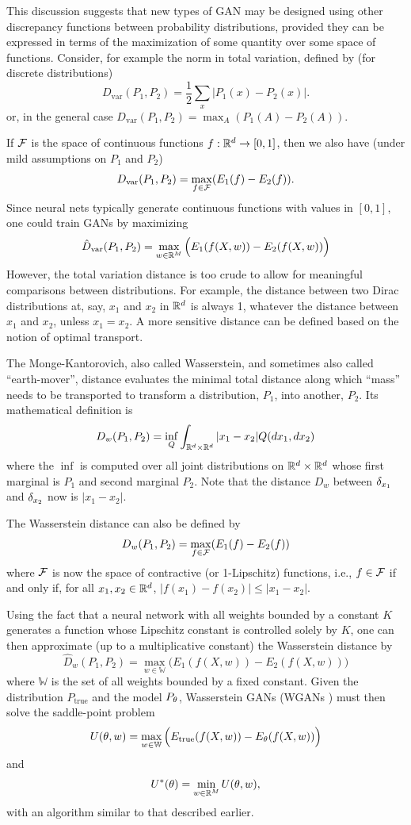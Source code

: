  This discussion suggests that new types of GAN may be designed using other discrepancy functions between probability distributions, provided they can be expressed in terms of the maximization of some quantity over some space of functions.
  Consider, for example the norm in total variation, defined by (for discrete distributions)
\[
D_{\mathrm{var}}(P_1,P_2) = \frac 12 \sum_{x} |P_1(x) - P_2(x)|.
\]
or, in the general case $D_{\mathrm{var}}(P_1,P_2)  = \max_A(P_1(A) - P_2(A))$.

 If ${\mathcal F}$ is the space of continuous functions $f: {\mathbb{R}}^d \to [0,1]$, then we also have (under mild assumptions on $P_1$ and $P_2$)
\[
D_{\mathrm{var}}(P_1,P_2)  = \max_{f\in{\mathcal F}} (E_1(f) - E_2(f)).
\]
 Since neural nets typically generate continuous functions with values in $[0,1]$, one could train GANs by maximizing 
\[
\hat D_{\mathrm{var}}(P_1, P_2) = 
\max_{w\in {\mathbb{R}}^M} \Big(E_{1}(f(X, w)) - E_{2}(f(X, w))\Big)
\]
 However, the total variation distance is too crude to allow for meaningful comparisons between distributions. For example, the distance between two Dirac distributions at, say,  $x_1$ and $x_2$ in ${\mathbb{R}}^d$ is always 1, whatever the distance between $x_1$ and $x_2$, unless $x_1=x_2$. A more sensitive distance can be defined based on the notion of optimal transport.


 The Monge-Kantorovich, also called Wasserstein, and sometimes also called ``earth-mover'', distance evaluates the minimal total distance along which ``mass'' needs to be transported to transform a distribution, $P_1$, into another, $P_2$.
 Its mathematical definition is
\[
D_w(P_1, P_2) = \inf_{Q} \int_{{\mathbb{R}}^d\times{\mathbb{R}}^d} |x_1-x_2| Q(dx_1,dx_2)
\]
where the $\inf$ is computed over all joint distributions on ${\mathbb{R}}^d\times{\mathbb{R}}^d$ whose first marginal is $P_1$ and second marginal $P_2$.
 Note that  the distance $D_w$ between $\delta_{x_1}$ and $\delta_{x_2}$ now is $|x_1-x_2|$.

The Wasserstein distance can also be defined by 
\[
D_{w}(P_1,P_2)  = \max_{f\in{\mathcal F}} (E_1(f) - E_2(f))
\]
where ${\mathcal F}$ is now the space of contractive (or 1-Lipschitz) functions, i.e., $f\in{\mathcal F}$ if and only if, for all $x_1, x_2\in{\mathbb{R}}^d$, 
$|f(x_1) - f(x_2)| \leq |x_1-x_2|$.

 Using the fact that a neural network with all weights bounded by a constant $K$ generates a function whose Lipschitz constant is controlled solely by $K$, one can then approximate (up to a  multiplicative constant) the Wasserstein distance by
\[
\hat D_{w}(P_1,P_2)  = \max_{w\in \mathbb W} \Big(E_{1}(f(X, w)) - E_{2}(f(X, w))\Big)
\]
where $\mathbb W$ is the set of all weights bounded by a fixed constant. Given the distribution $P_{\mathrm{true}}$ and the model $P_\theta$, Wasserstein GANs (WGANs \citep{arjovsky2017wasserstein}) must then solve the saddle-point problem 
\[
U(\theta, w) = \max_{w\in \mathbb W} \Big(E_{\mathrm{true}}(f(X, w)) - E_{\theta}(f(X, w))\Big)
\]
and 
\[
U^*(\theta) = \min_{w\in {\mathbb{R}}^M} U(\theta, w), 
\]
with an algorithm similar to that described earlier.

